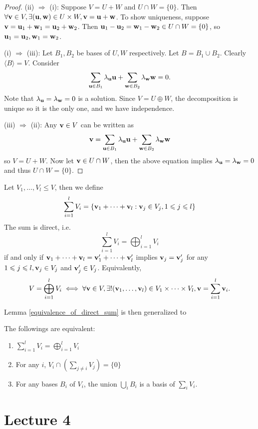 \documentclass[a4paper]{article}
\begin{document}
\begin{proof}
    (ii) $\Rightarrow$ (i): Suppose $V=U+W$ and $U\cap W=\{0\}$. Then $ \forall {\bf v}\in V,\exists ({\bf u},{\bf w})\in U\times W,{\bf v}={\bf u}+{\bf w} $. To show uniqueness, suppose $ {\bf v}={\bf u}_1+{\bf w}_1={\bf u}_2+{\bf w}_2 $. Then $ {\bf u}_1-{\bf u}_2={\bf w}_1-{\bf w}_2\in U \cap W=\{0\} $, so $ {\bf u}_1={\bf u}_2,{\bf w}_1={\bf w}_2$.

    (i) $\Rightarrow$ (iii): Let $ B_1,B_2 $ be bases of $U,W$ respectively. Let $ B=B_1 \cup B_2 $. Clearly $ \langle B \rangle =V $. Consider 
    \[
        \sum_{{\bf u}\in B_1}\lambda_{{\bf u}}{\bf u}+\sum_{{\bf w}\in B_2}\lambda_{{\bf w}}{\bf w}=0.
    \]
    Note that $ \lambda_{\bf u}=\lambda_{\bf w}=0 $ is a solution. Since $ V =U\oplus W $, the decomposition is unique so it is the only one, and we have independence.

    (iii) $\Rightarrow$ (ii): Any ${\bf v}\in V$ can be written as 
    \[
        {\bf v}=\sum_{{\bf u}\in B_1}\lambda_{{\bf u}}{\bf u}+\sum_{{\bf w}\in B_2}\lambda_{{\bf w}}{\bf w}
    \]
    so $ V=U+W $. Now let $ {\bf v}\in U\cap W $, then the above equation implies $\lambda_{\bf u}=\lambda_{\bf w}=0 $ and thus $ U\cap W=\{0\} $.
\end{proof}
\begin{definition}
    Let $V_1,\ldots,V_l\le V$, then we define
    $$\sum_{i=1}^lV_i=\{{\bf v}_1+\cdots+{\bf v}_l:{\bf v}_j\in V_j,1\leqslant j\leqslant l\}$$
    The sum is direct, i.e.
    $$\sum_{i=1}^lV_i=\bigoplus_{i=1}^lV_i$$
    if and only if ${\bf v}_1+\cdots +{\bf v}_l={\bf v}_1'+\cdots +{\bf v}_l'$ implies ${\bf v}_j={\bf v}_j'$ for any $1\leqslant j\leqslant l,{\bf v}_j\in V_j$ and $ {\bf v}_j'\in V_j $.
    Equivalently,
    $$V=\bigoplus_{i=1}^lV_i\iff \forall {\bf v}\in V,\exists!({\bf v}_1,\ldots,{\bf v}_l)\in V_1\times\cdots\times V_l,{\bf v}=\sum_{i=1}^l{\bf v}_i.$$
\end{definition}
Lemma \ref{equivalence_of_direct_sum} is then generalized to
\begin{proposition}
    The followings are equivalent:
    \begin{enumerate}
        \item $\sum_{i=1}^lV_i=\bigoplus_{i=1}^lV_i$
        \item For any $i$,
        $V_i\cap\left( \sum_{j\neq i}V_j \right)=\{0\}$
        \item For any bases $B_i$ of $V_i$, the union $\bigcup_iB_i$ is a basis of $\sum_iV_i$.
    \end{enumerate}
\end{proposition}
\newpage
\part*{Lecture 4}
\end{document}
